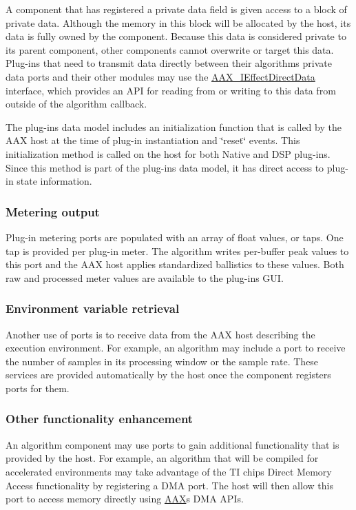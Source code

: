 A component that has registered a private data field is given access to a block of private data. Although the memory in this block will be allocated by the host, its data is fully owned by the component. Because this data is considered private to its parent component, other components cannot overwrite or target this data. Plug-\/ins that need to transmit data directly between their algorithms\textquotesingle{} private data ports and their other modules may use the \hyperlink{a00097}{A\+A\+X\+\_\+\+I\+Effect\+Direct\+Data} interface, which provides an A\+P\+I for reading from or writing to this data from outside of the algorithm callback.

The plug-\/in\textquotesingle{}s data model includes an initialization function that is called by the A\+A\+X host at the time of plug-\/in instantiation and \char`\"{}reset\char`\"{} events. This initialization method is called on the host for both Native and D\+S\+P plug-\/ins. Since this method is part of the plug-\/in\textquotesingle{}s data model, it has direct access to plug-\/in state information.

\hypertarget{a00327_subsection__metering_output}{}\subsubsection{Metering output}\label{a00327_subsection__metering_output}
Plug-\/in metering ports are populated with an array of float values, or \textquotesingle{}taps\textquotesingle{}. One tap is provided per plug-\/in meter. The algorithm writes per-\/buffer peak values to this port and the A\+A\+X host applies standardized ballistics to these values. Both raw and processed meter values are available to the plug-\/in\textquotesingle{}s G\+U\+I.

\hypertarget{a00327_subsection__environment_variable_retrieval}{}\subsubsection{Environment variable retrieval}\label{a00327_subsection__environment_variable_retrieval}
Another use of ports is to receive data from the A\+A\+X host describing the execution environment. For example, an algorithm may include a port to receive the number of samples in its processing window or the sample rate. These services are provided automatically by the host once the component registers ports for them.

\hypertarget{a00327_subsection__other_functionality_enhancement}{}\subsubsection{Other functionality enhancement}\label{a00327_subsection__other_functionality_enhancement}
An algorithm component may use ports to gain additional functionality that is provided by the host. For example, an algorithm that will be compiled for accelerated environments may take advantage of the T\+I chip\textquotesingle{}s Direct Memory Access functionality by registering a D\+M\+A port. The host will then allow this port to access memory directly using \hyperlink{a00288}{A\+A\+X}\textquotesingle{}s D\+M\+A A\+P\+Is.



